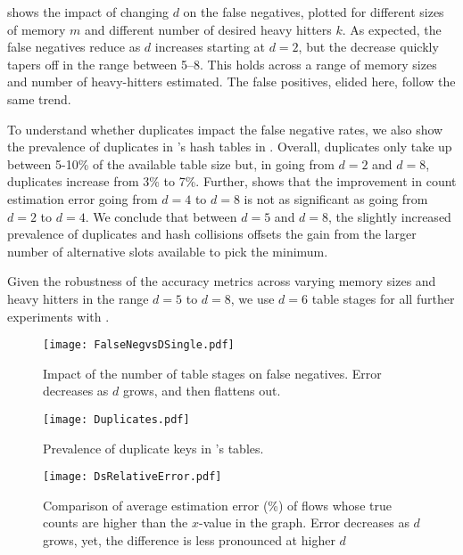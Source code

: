  shows the impact of changing $d$ on the false negatives,
plotted for different sizes of memory $m$ and different number of desired heavy
hitters $k$. As expected, the false negatives reduce as $d$ increases starting
at $d=2$, but the decrease quickly tapers off in the range between 5--8. This
holds across a range of memory sizes and number of heavy-hitters estimated. The
false positives, elided here, follow the same trend.

To understand whether duplicates impact the false negative rates, we also show
the prevalence of duplicates in \TheSystem's hash tables in
. Overall, duplicates only take up between 5-10\% of the
available table size but, in going from $d=2$ and $d=8$, duplicates increase
from 3\% to 7\%. Further,  shows that the improvement
in count estimation error going from $d=4$ to $d=8$ is not as significant as
going from $d=2$ to $d=4$.
%
We conclude that between $d=5$ and $d=8$, the slightly increased prevalence of
duplicates and hash collisions offsets the gain from the larger number of
alternative slots available to pick the minimum.
%

 Given the robustness of the accuracy
metrics across varying memory sizes and heavy hitters in the range $d=5$ to
$d=8$, we use $d=6$ table stages for all further experiments with \TheSystem.

\iffalse
\begin{figure}[h]
\texttt{[image: WFalseNegsvsDsSingle.pdf]}
\caption{Weighted fraction of Heavy Hitters Reported for Different $d$ values  with 500000 flows in total}
\label{fig:weightedNegvsD}
\end{figure}
\fi

\begin{figure}[h]
\texttt{[image: FalseNegvsDSingle.pdf]}
\caption{Impact of the number of table stages on false negatives. Error
  decreases as $d$ grows, and then flattens out.}
\label{fig:falseNegvsD}
\end{figure}

\begin{figure}[h]
\texttt{[image: Duplicates.pdf]}
\caption{Prevalence of duplicate keys in \TheSystem's tables.}
\label{fig:duplicates}
\end{figure}

\begin{figure}[h]
\texttt{[image: DsRelativeError.pdf]}
\caption{Comparison of average estimation error (\%) of flows whose true counts
  are higher than the $x$-value in the graph. Error
 decreases as $d$ grows, yet, the difference is less pronounced at higher $d$}
\label{fig:estimation-error-D}
\end{figure}

